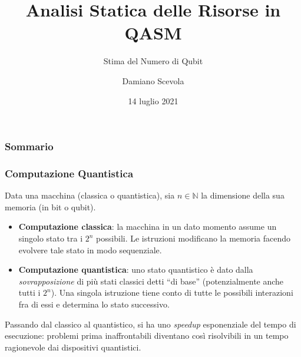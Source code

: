 \documentclass{beamer}
\title{Analisi Statica delle Risorse in QASM}
\subtitle{Stima del Numero di Qubit}
\author{Damiano Scevola}
\institute{Alma Mater Studiorum - Università di Bologna}
\date{14 luglio 2021}
\makeatletter
\newcommand\listofframes{\@starttoc{lbf}}
\makeatother
\begin{document}
\abovedisplayskip=0pt
\abovedisplayshortskip=0pt
\belowdisplayskip=0pt
\belowdisplayshortskip=0pt
\begin{frame}
\titlepage
\end{frame}

\begin{frame}
    \frametitle{Sommario}
    \listofframes
\end{frame}

\begin{frame}
    \frametitle{Computazione Quantistica}
    Data una macchina (classica o quantistica), sia $n \in \mathbb{N}$ la dimensione della sua memoria (in bit o qubit).
    \begin{itemize}
        \item \textbf{Computazione classica}: la macchina in un dato momento assume un singolo stato tra i $2^n$ possibili. Le istruzioni modificano la memoria facendo evolvere tale stato in modo sequenziale.
        \item \textbf{Computazione quantistica}: uno stato quantistico è dato dalla \textit{sovrapposizione} di più stati classici detti ``di base'' (potenzialmente anche tutti i $2^n$). Una singola istruzione tiene conto di tutte le possibili interazioni fra di essi e determina lo stato successivo.
    \end{itemize}
    Passando dal classico al quantistico, si ha uno \textit{speedup} esponenziale del tempo di esecuzione: problemi prima inaffrontabili diventano così risolvibili in un tempo ragionevole dai dispositivi quantistici.
\end{frame}
\end{document}
